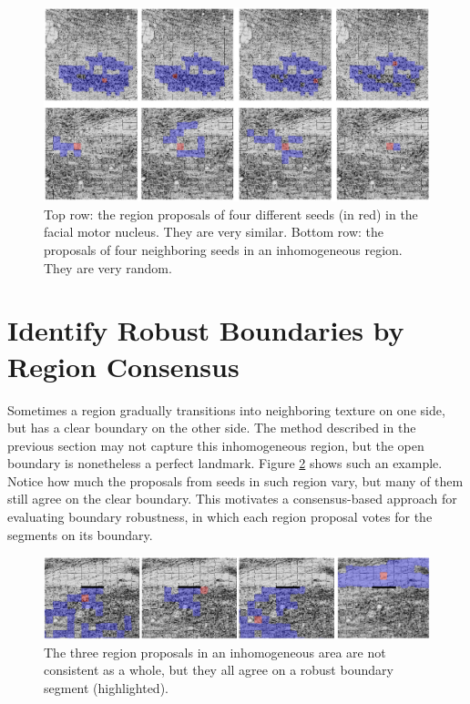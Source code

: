 \documentclass{llncs}
\begin{document}

\begin{figure}
\centering
	\includegraphics[width=.8\textwidth]{../figures/ProposalsGoodAndBad.png}
	\caption{Top row: the region proposals of four different seeds (in red) in the facial motor nucleus. They are very similar. Bottom row: the proposals of four neighboring seeds in an inhomogeneous region. They are very random.} %
	\label{fig:ConsistentProposals}
\end{figure}

 
\section{Identify Robust Boundaries by Region Consensus}

Sometimes a region gradually transitions into neighboring texture on one side, but has a clear boundary on the other side. The method described in the previous section may not capture this inhomogeneous region, but the open boundary is nonetheless a perfect landmark. Figure \ref{fig:RobustBoundaryExample} shows such an example. Notice how much the proposals from seeds in such region vary, but many of them still agree on the clear boundary. This motivates a consensus-based approach for evaluating boundary robustness, in which each region proposal votes for the segments on its boundary.
\begin{figure}
	\centering
	\includegraphics[width=.8\textwidth]{../figures/RobustBoundaryExampleHighlightLine.png}
	\caption{The three region proposals in an inhomogeneous area are not consistent as a whole, but they all agree on a robust boundary segment (highlighted).}
	\label{fig:RobustBoundaryExample}
\end{figure}
\end{document}
